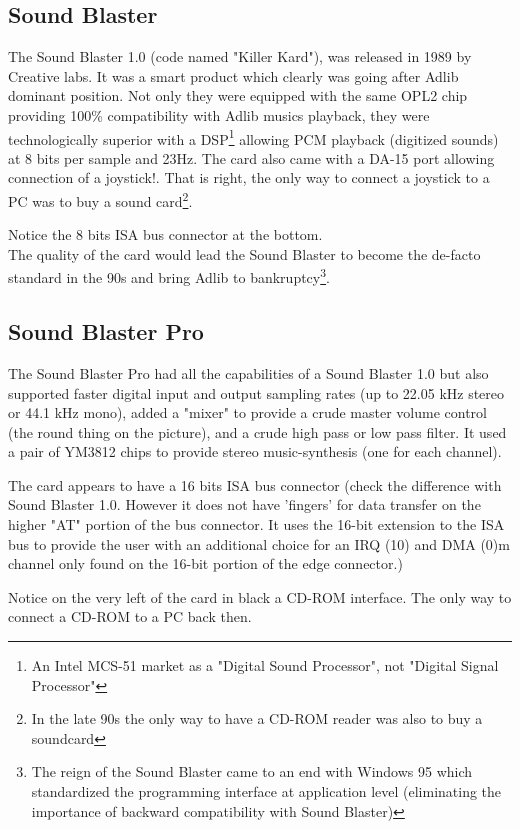 \documentclass[book.tex]{subfiles}
\begin{document}
  \subsection{Sound Blaster}
  The Sound Blaster 1.0 (code named "Killer Kard"), was released in 1989 by Creative labs. It was a smart product which clearly was going after Adlib dominant position. Not only they were equipped with the same OPL2 chip providing 100\% compatibility with Adlib musics playback, they were technologically superior with a DSP\footnote{An Intel MCS-51 market as a "Digital Sound Processor", not "Digital Signal Processor"}  allowing PCM playback (digitized sounds) at 8 bits per sample and 23Hz. The card also came with a DA-15 port allowing connection of a joystick!. That is right, the only way to connect a joystick to a PC was to buy a sound card\footnote{In the late 90s the only way to have a CD-ROM reader was also to buy a soundcard}.\\ 
\par

\begin{figure}[H] 
  \centering 
\end{figure}
 Notice the 8 bits ISA bus connector at the bottom.\\
   The quality of the card would lead the Sound Blaster to become the de-facto standard in the 90s and bring Adlib to bankruptcy\footnote{The reign of the Sound Blaster came to an end with Windows 95 which standardized the programming interface at application level (eliminating the importance of backward compatibility with Sound Blaster)}.


  \subsection{Sound Blaster Pro}
The Sound Blaster Pro had all the capabilities of a Sound Blaster 1.0 but also supported faster digital input and output sampling rates (up to 22.05 kHz stereo or 44.1 kHz mono), added a "mixer" to provide a crude master volume control (the round thing on the picture), and a crude high pass or low pass filter. It used a pair of YM3812 chips to provide stereo music-synthesis (one for each channel).\\
\begin{figure}[H] 
  \centering 
\end{figure}
 The card appears to have a 16 bits ISA bus connector (check the difference with Sound Blaster 1.0. However it does not have 'fingers' for data transfer on the higher "AT" portion of the bus connector. It uses the 16-bit extension to the ISA bus to provide the user with an additional choice for an IRQ (10) and DMA (0)m channel only found on the 16-bit portion of the edge connector.)\\
\par
{} Notice on the very left of the card in black a CD-ROM interface. The only way to connect a CD-ROM to a PC back then.
\end{document}
